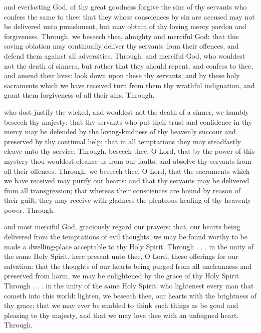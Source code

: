 \begin{multicols}{2}
 and everlasting God, of thy great goodness forgive the sins of thy servants who confess the same to thee: that they whose consciences by sin are accused may not be delivered unto punishment, but may obtain of thy loving mercy pardon and forgiveness. Through.
 we beseech thee, almighty and merciful God: that this saving oblation may continually deliver thy servants from their offences, and defend them against all adversities. Through.
 and merciful God, who wouldest not the death of sinners, but rather that they should repent, and confess to thee, and amend their lives: look down upon these thy servants; and by these holy sacraments which we have received turn from them thy wrathful indignation, and grant them forgiveness of all their sins. Through.

 who dost justify the wicked, and wouldest not the death of a sinner, we humbly beseech thy majesty: that thy servants who put their trust and confidence in thy mercy may be defended by the loving-kindness of thy heavenly succour and preserved by thy continual help; that in all temptations they may steadfastly cleave unto thy service. Through.
 beseech thee, O Lord, that by the power of this mystery thou wouldest cleanse us from our faults, and absolve thy servants from all their offences. Through.
 we beseech thee, O Lord, that the sacraments which we have received may purify our hearts: and that thy servants may be delivered from all transgression; that whereas their consciences are bound by reason of their guilt, they may receive with gladness the plenteous healing of thy heavenly power. Through.

 and most merciful God, graciously regard our prayers: that, our hearts being delivered from the temptations of evil thoughts; we may be found worthy to be made a dwelling-place acceptable to thy Holy Spirit. Through . . . in the unity of the same Holy Spirit.
 here present unto thee, O Lord, these offerings for our salvation: that the thoughts of our hearts being purged from all uncleanness and preserved from harm, we may be enlightened by the grace of thy Holy Spirit. Through . . . in the unity of the same Holy Spirit.
 who lightenest every man that cometh into this world: lighten, we beseech thee, our hearts with the brightness of thy grace; that we may ever be enabled to think such things as be good and pleasing to thy majesty, and that we may love thee with an unfeigned heart. Through.


\end{multicols}
